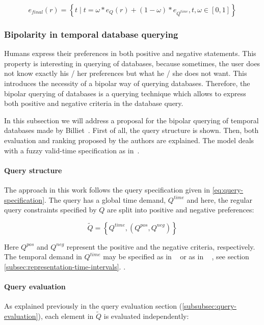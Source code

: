 \begin{equation}
\label{eq:convex-combination}
e_{final} \left( r \right) = \left \lbrace t \mid t = \omega \ast e_{Q} \left( r \right) + \left( 1- \omega \right) \ast e_{Q^{time}}, t,\omega \in \left[0,1\right] \right \rbrace
\end{equation}




\subsubsection{Bipolarity in temporal database querying}
\label{subsubsec:bipolarity}
Humans express their preferences in both positive and negative statements. This property is interesting in querying of databases, because sometimes, the user does not know exactly his / her preferences but what he / she does not want. This introduces the necessity of a bipolar way of querying databases. Therefore, the bipolar querying of databases is a querying technique which allows to express both positive and negative criteria in the database query.

In this subsection we will address a proposal for the bipolar querying of temporal databases made by Billiet~\cite{Billiet:Pons:Matthe:DeTre:Pons:2011:BipolarFuzzy}. First of all, the query structure is shown. Then, both evaluation and ranking proposed by the authors are explained. The model deals with a fuzzy valid-time specification as in~\cite{garrido2009}.

\paragraph{Query structure}
The approach in this work follows the query specification given in \eqref{eq:query-specification}. The query has a global time demand, $Q^{time}$ and here, the regular query constraints specified by $Q$ are split into positive and negative preferences:

\begin{equation}
\label{eq:bipolar-specification}
\tilde{Q} = \left \lbrace Q^{time}, \left( Q^{pos}, Q^{neg} \right) \right \rbrace
\end{equation}

Here $Q^{pos}$ and $Q^{neg}$ represent the positive and the negative criteria, respectively. The temporal demand in $Q^{time}$ may be specified as in ~\cite{garrido2009} or as in ~ \cite{Pon11}, see section \ref{subsec:representation-time-intervals}.
.
\paragraph{Query evaluation}
As explained previously in the query evaluation section (\ref{subsubsec:query-evaluation}), each element in $\tilde{Q}$ is evaluated independently:

